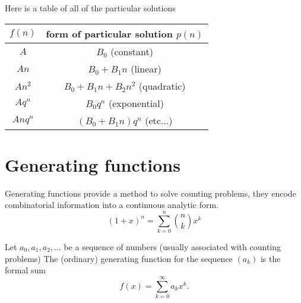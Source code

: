 \documentclass[10pt, a4paper]{article}
\begin{document}
Here is a table of all of the particular solutions
\begin{table}[H]
    \centering
    \begin{tabular}{c|c}
         $f(n)$ & form of particular solution $p(n)$ \\
         \hline
         $A$ & $B_0$ (constant) \\
         $An$ & $B_0 + B_1n$ (linear) \\
         $An ^ 2$ & $B_0 + B_1n + B_2n ^ 2$ (quadratic) \\
         $Aq ^ n$ & $B_0q ^ n$ (exponential) \\
         $Anq ^ n$ & $(B_0 + B_1n)q ^ n$ (etc$\dotsc$)
    \end{tabular}
\end{table}

\newpage

\section{Generating functions}
Generating functions provide a method to solve counting problems,
they encode combinatorial information into a continuous analytic form.
\[
(1 + x) ^ n = \sum_{k = 0} ^ n\binom{n}{k}x ^ k
\]
\begin{definition}
    Let $a_0, a_1, a_2, \dotsc$ be a sequence of numbers
    (usually associated with counting problems)
    The
    (ordinary)
    generating function for the sequence $(a_k)$ is the formal sum
    \[
    f(x) = \sum_{k = 0}^{\infty}a_kx ^ k.
    \]
\end{definition}
\end{document}
